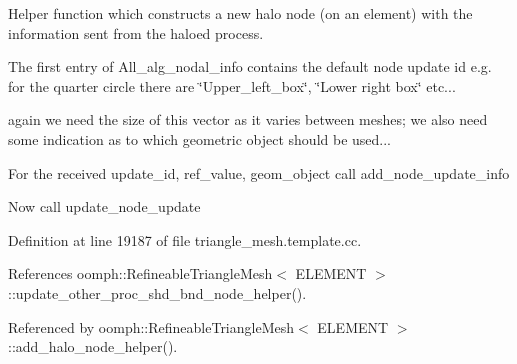 Helper function which constructs a new halo node (on an element) with the information sent from the haloed process. 

The first entry of All\+\_\+alg\+\_\+nodal\+\_\+info contains the default node update id e.\+g. for the quarter circle there are \char`\"{}\+Upper\+\_\+left\+\_\+box\char`\"{}, \char`\"{}\+Lower right box\char`\"{} etc...

again we need the size of this vector as it varies between meshes; we also need some indication as to which geometric object should be used...

For the received update\+\_\+id, ref\+\_\+value, geom\+\_\+object call add\+\_\+node\+\_\+update\+\_\+info

Now call update\+\_\+node\+\_\+update 

Definition at line 19187 of file triangle\+\_\+mesh.\+template.\+cc.



References oomph\+::\+Refineable\+Triangle\+Mesh$<$ E\+L\+E\+M\+E\+N\+T $>$\+::update\+\_\+other\+\_\+proc\+\_\+shd\+\_\+bnd\+\_\+node\+\_\+helper().



Referenced by oomph\+::\+Refineable\+Triangle\+Mesh$<$ E\+L\+E\+M\+E\+N\+T $>$\+::add\+\_\+halo\+\_\+node\+\_\+helper().

\mbox{\label{classoomph_1_1RefineableTriangleMesh_aa772a7cb98786a8296cc1d0b51e40f88}} 
